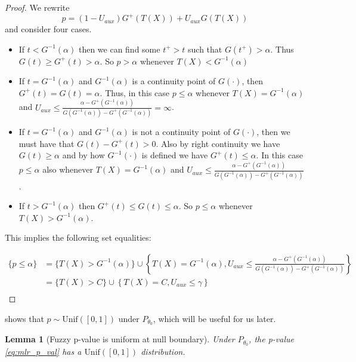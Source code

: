\documentclass{article}
\newtheorem{lemma}{Lemma}
\begin{document}
\begin{appendix}
\begin{proof} We rewrite 
    \begin{equation*}
        p = (1 - U_{aux})G^+(T(X)) + U_{aux} G(T(X))
    \end{equation*}
    and consider four  cases. 
    \begin{itemize}
        \item If $t < G^{-1}(\alpha)$ then we can find some $t^+ > t$ such that $G(t^+) > \alpha$. Thus $G(t) \geq G^{+}(t) > \alpha$. So $p > \alpha$ whenever $T(X) < G^{-1}(\alpha)$ 
        \item If $t = G^{-1}(\alpha)$ and $G^{-1}(\alpha)$ is a continuity point of $G(\cdot)$, then $G^{+}(t) = G(t) = \alpha$. Thus, in this case $p \leq \alpha$ whenever $T(X) = G^{-1}(\alpha)$ and $U_{aux} \leq  \frac{\alpha - G^+(G^{-1}(\alpha))}{G(G^{-1}(\alpha)) - G^+(G^{-1}(\alpha))} = \infty$. 
        \item If $t = G^{-1}(\alpha)$ and $G^{-1}(\alpha)$ is not a continuity point of $G(\cdot)$, then we must have that $G(t) - G^+(t)  > 0$. Also by right continuity we have $G(t) \geq \alpha$ and by how $G^{-1}(\cdot)$ is defined we have $G^+(t) \leq \alpha$. In this case $p \leq \alpha$ also whenever $T(X) = G^{-1}(\alpha)$ and $U_{aux} \leq  \frac{\alpha - G^+(G^{-1}(\alpha))}{G(G^{-1}(\alpha)) - G^+(G^{-1}(\alpha))}$. 
        \item If $t > G^{-1}(\alpha)$ then $G^+(t) \leq G(t) \leq \alpha$. So $p \leq \alpha$ whenever $T(X) > G^{-1}(\alpha)$. 
    \end{itemize}


    This implies the following set equalities:

    \begin{align*}
        \{p \leq \alpha \} &= \{T(X) > G^{-1}(\alpha) \} \cup \left\{T(X) =  G^{-1}(\alpha), U_{aux} \leq \frac{\alpha - G^+(G^{-1}(\alpha))}{G(G^{-1}(\alpha)) - G^+(G^{-1}(\alpha))} \right\}\\
                           &= \{T(X) > C \} \cup \left\{T(X) =  C, U_{aux} \leq \gamma \right\}\\
    \end{align*}

\end{proof}


 shows that $p \sim \text{Unif}([0, 1])$ under $P_{\theta_0}$, which will be useful for us later. 

\begin{lemma}[Fuzzy p-value is uniform at null boundary]
    \label{lem:uniform}
    Under $P_{\theta_0}$, the p-value \eqref{eq:mlr_p_val} has a $\text{Unif}([0, 1])$ distribution.
\end{lemma}


\end{appendix}
\end{document}
